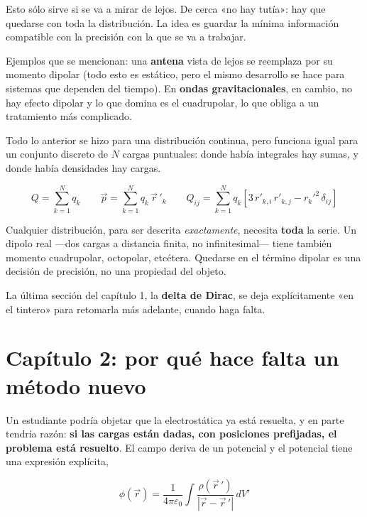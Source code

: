 \documentclass[12pt,a4paper]{article}
\begin{document}
\begin{notebox}
Esto sólo sirve si se va a mirar de lejos. De cerca «no hay tutía»: hay que
quedarse con toda la distribución. La idea es guardar la mínima información
compatible con la precisión con la que se va a trabajar.

Ejemplos que se mencionan: una \textbf{antena} vista de lejos se reemplaza por su
momento dipolar (todo esto es estático, pero el mismo desarrollo se hace para
sistemas que dependen del tiempo). En \textbf{ondas gravitacionales}, en cambio,
no hay efecto dipolar y lo que domina es el cuadrupolar, lo que obliga a un
tratamiento más complicado.
\end{notebox}

Todo lo anterior se hizo para una distribución continua, pero funciona igual para
un conjunto discreto de $N$ cargas puntuales: donde había integrales hay sumas, y
donde había densidades hay cargas.

\[
Q = \sum_{k=1}^{N} q_k
\qquad
\vec p = \sum_{k=1}^{N} q_k\,\vec r\,'_k
\qquad
Q_{ij} = \sum_{k=1}^{N} q_k\left[3\,r'_{k,i}\,r'_{k,j} - r_k'^2\,\delta_{ij}\right]
\]

\begin{warnbox}
Cualquier distribución, para ser descrita \emph{exactamente}, necesita
\textbf{toda} la serie. Un dipolo real ---dos cargas a distancia finita, no
infinitesimal--- tiene también momento cuadrupolar, octopolar, etcétera.
Quedarse en el término dipolar es una decisión de precisión, no una propiedad del
objeto.
\end{warnbox}

\begin{notebox}
La última sección del capítulo 1, la \textbf{delta de Dirac}, se deja
explícitamente «en el tintero» para retomarla más adelante, cuando haga falta.
\end{notebox}

\section{Capítulo 2: por qué hace falta un método nuevo}

Un estudiante podría objetar que la electrostática ya está resuelta, y en parte
tendría razón: \textbf{si las cargas están dadas, con posiciones prefijadas, el
problema está resuelto}. El campo deriva de un potencial y el potencial tiene una
expresión explícita,

\[
\phi(\vec r) = \frac{1}{4\pi\varepsilon_0}\int \frac{\rho(\vec r\,')}{|\vec r - \vec r\,'|}\,dV'
\]
\end{document}
